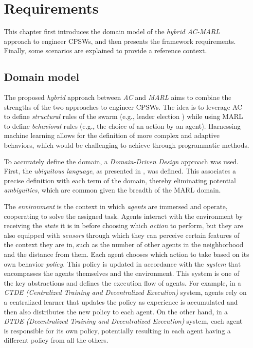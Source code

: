 \documentclass[12pt,a4paper,openright,twoside]{book}
\begin{document}
\chapter{Requirements} 
\label{chap:requirements}
This chapter first introduces the domain model of the \emph{hybrid AC-MARL} approach to engineer CPSWs, 
    and then presents the framework requirements. Finally, some scenarios
    are explained to provide a reference context.

\section{Domain model}
The proposed \emph{hybrid} approach between \emph{AC} and \emph{MARL} aims to combine the strengths of the two 
    approaches to engineer CPSWs.
    The idea is to leverage AC to define \emph{structural} rules of the swarm (e.g., leader election \cite{pianini2022self}) 
    while using MARL to define \emph{behavioral} rules (e.g., the choice of an action by an agent).
    Harnessing machine learning allows for the definition of more complex and adaptive behaviors, 
    which would be challenging to achieve through programmatic methods.

To accurately define the domain, a \emph{Domain-Driven Design} \cite{evans2004domain} approach was used. 
    First, the \emph{ubiquitous language}, as presented in , was defined. 
    This associates a precise definition with each term of the domain, thereby 
    eliminating potential \emph{ambiguities}, which are common given the breadth of the MARL domain.

The \emph{environment} is the context in which \emph{agents} are immersed and operate, cooperating to solve the assigned task. 
    Agents interact with the environment by receiving the \emph{state} it is in before choosing which \emph{action} to perform,
    but they are also equipped with \emph{sensors} through which they can perceive certain features of the context they are in, 
    such as the number of other agents in the neighborhood and the distance from them.
    Each agent chooses which action to take based on its own behavior \emph{policy}. This policy is updated in accordance 
    with the \emph{system} that encompasses the agents themselves and the environment. This system is one of the key abstractions 
    and defines the execution flow of agents. For example, in a \emph{CTDE (Centralized Training and Decentralized Execution)}
    system, agents rely on a centralized learner that updates the policy as experience is accumulated and then also 
    distributes the new policy to each agent. On the other hand, in a \emph{DTDE (Decentralized Training and Decentralized 
    Execution)} system, each agent is responsible for its own policy, potentially resulting in each agent having a 
    different policy from all the others.
\end{document}
